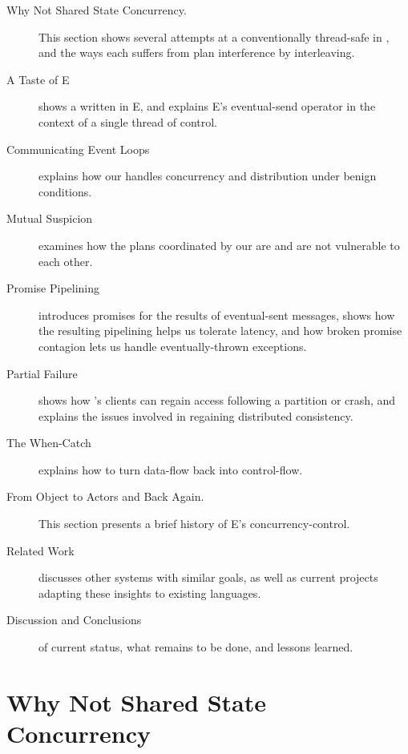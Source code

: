 \documentclass{llncs}
\begin{document}
\begin{description}
\item[Why Not Shared State Concurrency.] This section shows several
attempts at a conventionally thread-safe  in
, and the ways each suffers from plan interference by
interleaving.

\item[A Taste of E] shows a  written in E, and explains
E's eventual-send operator in the context of a single thread of
control.

\item[Communicating Event Loops] explains how our 
handles concurrency and distribution under benign conditions.

\item[Mutual Suspicion] examines how the plans coordinated by our
 are and are not vulnerable to each other.

\item[Promise Pipelining] introduces promises for the results of
eventual-sent messages, shows how the resulting pipelining helps us
tolerate latency, and how broken promise contagion lets us handle
eventually-thrown exceptions.

\item[Partial Failure] shows how 's clients can
regain access following a partition or crash, and explains the issues
involved in regaining distributed consistency.

\item[The When-Catch] explains how to turn data-flow back into
control-flow.

\item[From Object to Actors and Back Again.] This section presents a
brief history of E's concurrency-control.

\item[Related Work] discusses other systems with similar goals, as
well as current projects adapting these insights to existing
languages.

\item[Discussion and Conclusions] of current status, what remains to
be done, and lessons learned.

\end{description}

\section{Why Not Shared State Concurrency}
\end{document}
